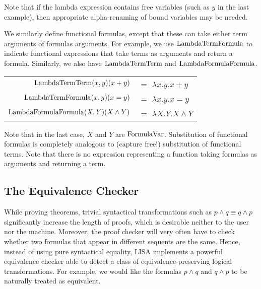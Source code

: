 Note that if the lambda expression contains free variables (such as $y$ in the last example), then appropriate alpha-renaming of bound variables may be needed.

We similarly define functional formulas, except that these can take either term arguments of formulas arguments. For example, we use $\operatorname{LambdaTermFormula}$ to indicate functional expressions that take terms as arguments and return a formula. Similarly, we also have $\operatorname{LambdaTermTerm}$ and $\operatorname{LambdaFormulaFormula}$.

\begin{example}
  \begin{center}
    \begin{tabular}{|r l|}
      \hline
      \rule{0em}{1.3em}
      $\operatorname{LambdaTermTerm}(x, y)(x+y)$       & $=$ $\lambda x.y. x+y$       \\
      $\operatorname{LambdaTermFormula}(x, y)(x=y)$       & $=$ $\lambda x.y. x=y$       \\
      $\operatorname{LambdaFormulaFormula}(X, Y)(X \land Y)$ & $=$ $\lambda X.Y. X \land Y$
      \rule[-1em]{0em}{0em}                                       \\
      \hline
    \end{tabular}
  \end{center}

\end{example}

Note that in the last case, $X$ and $Y$ are $\operatorname{FormulaVar}$. Substitution of functional formulas is completely analogous to (capture free!) substitution of functional terms. Note that there is no expression representing a function taking formulas as arguments and returning a term.

\subsection{The Equivalence Checker}
\label{subsec:equivalencechecker}

While proving theorems, trivial syntactical transformations such as $p\land q \equiv q\land p$ significantly increase the length of proofs, which is desirable neither to the user nor the machine. Moreover, the proof checker will very often have to check whether two formulas that appear in different sequents are the same. Hence, instead of using pure syntactical equality, LISA implements a powerful equivalence checker able to detect a class of equivalence-preserving logical transformations. For example, we would like the  formulas $p\land q$ and $q\land p$ to be naturally treated as equivalent.

